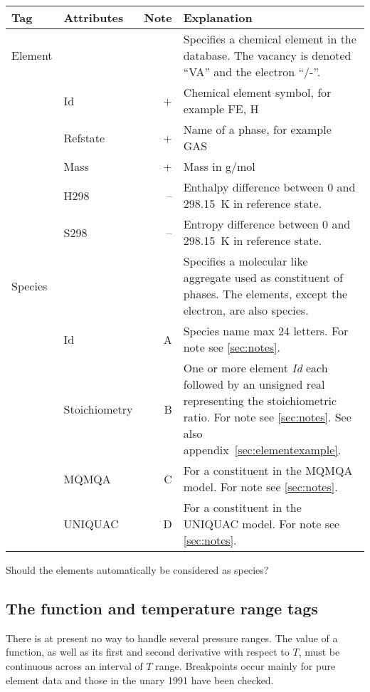 \documentclass{article}
\begin{document}
\bigskip
\begin{tabular}{|p{} p{} r p{}|}\hline
  Tag & Attributes & Note & Explanation\\\hline

  Element & && Specifies a chemical element in the database.  The vacancy is denoted ``VA'' and the electron ``/-''.\\
          & Id        & +    & Chemical element symbol, for example FE, H \\
          & Refstate  & +    & Name of a phase, for example GAS \\
          & Mass      & +    & Mass in g/mol\\
          & H298      & --    & Enthalpy difference between 0 and 298.15~K in reference state.\\
          & S298      & --    & Entropy difference between 0 and 298.15~K in reference state.\\\hline

  Species & && Specifies a molecular like aggregate used as constituent of phases.  The elements, except the electron, are also species.\\
          & Id        & A & Species name max 24 letters. For note see \ref{sec:notes}.\\
          & Stoichiometry & B & One or more element {\em Id} each followed by an unsigned real representing the stoichiometric ratio.  For note see \ref{sec:notes}.  See also appendix~\ref{sec:elementexample}.\\
          & MQMQA & C & For a constituent in the MQMQA model.  For note see \ref{sec:notes}.\\
          & UNIQUAC & D & For a constituent in the UNIQUAC model.  For note see \ref{sec:notes}.\\\hline

\end{tabular}

\bigskip

Should the elements automatically be considered as species?

\newpage 

\subsection{The function and temperature range tags}\label{sec:tpfun}

There is at present no way to handle several pressure ranges.  The
value of a function, as well as its first and second derivative with
respect to $T$, must be continuous across an interval of $T$ range.
Breakpoints occur mainly for pure element data and those in the unary
1991 have been checked.
\end{document}
